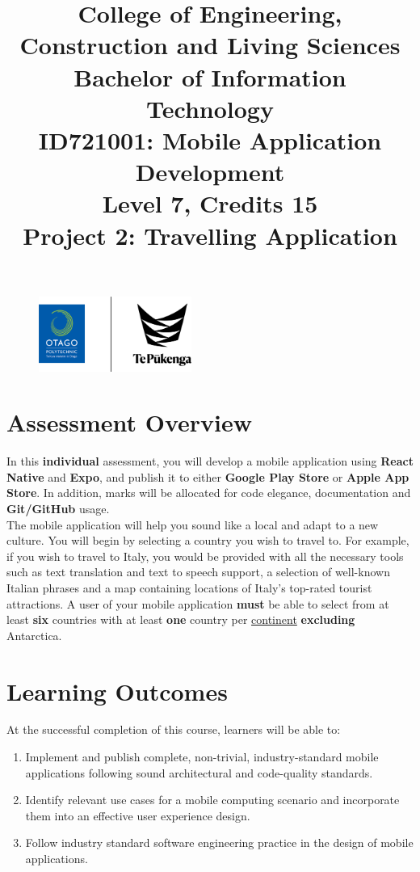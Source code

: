 \documentclass{article}
\author{}
\begin{document}
\begin{figure}
	\centering
	\includegraphics[width=50mm]{../../resources (ignore)/img/logo.png}
\end{figure}

\title{College of Engineering, Construction and Living Sciences\\Bachelor of Information Technology\\ID721001: Mobile Application Development\\Level 7, Credits 15\\\textbf{Project 2: Travelling Application}}
\date{}
\maketitle

\section*{Assessment Overview}
In this \textbf{individual} assessment, you will develop a mobile application using \textbf{React Native} and \textbf{Expo}, and publish it to either \textbf{Google Play Store} or \textbf{Apple App Store}. In addition, marks will be allocated for code elegance, documentation and \textbf{Git/GitHub} usage. \\

The mobile application will help you sound like a local and adapt to a new culture. You will begin by selecting a country you wish to travel to. For example, if you wish to travel to Italy, you would be provided with all the necessary tools such as text translation and text to speech support, a selection of well-known Italian phrases and a map containing locations of Italy's top-rated tourist attractions. A user of your mobile application \textbf{must} be able to select from at least \textbf{six} countries with at least \textbf{one} country per \href{https://www.worldometers.info/geography/7-continents/}{continent} \textbf{excluding} Antarctica.

\section*{Learning Outcomes}
At the successful completion of this course, learners will be able to:
\begin{enumerate}
	\item Implement and publish complete, non-trivial, industry-standard mobile applications following sound architectural and code-quality standards.
	\item Identify relevant use cases for a mobile computing scenario and incorporate them into an effective user experience design.
	\item Follow industry standard software engineering practice in the design of mobile applications.
\end{enumerate}
\end{document}
